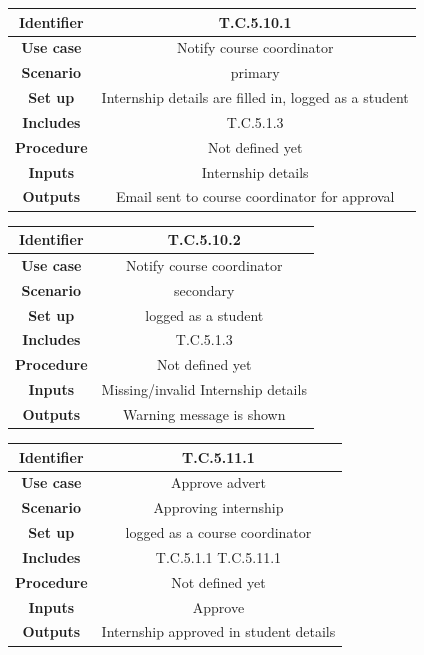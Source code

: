 \documentclass{l3deliverable}
\begin{document}
\begin{tabular}{|c|c|}
\hline \textbf{Identifier} & T.C.5.10.1\\
\hline \textbf{Use case} & Notify course coordinator\\
\hline \textbf{Scenario} & primary\\
\hline \textbf{Set up} & Internship details are filled in, logged as a student\\
\hline \textbf{Includes} & T.C.5.1.3\\
\hline \textbf{Procedure} & Not defined yet\\
\hline \textbf{Inputs} & Internship details\\
\hline \textbf{Outputs} & Email sent to course coordinator for approval\\
\hline
\end{tabular}

\begin{tabular}{|c|c|}
\hline \textbf{Identifier} & T.C.5.10.2\\
\hline \textbf{Use case} & Notify course coordinator\\
\hline \textbf{Scenario} & secondary\\
\hline \textbf{Set up} & logged as a student\\
\hline \textbf{Includes} & T.C.5.1.3\\
\hline \textbf{Procedure} & Not defined yet\\
\hline \textbf{Inputs} & Missing/invalid Internship details\\
\hline \textbf{Outputs} & Warning message is shown\\
\hline
\end{tabular}

\begin{tabular}{|c|c|}
\hline \textbf{Identifier} & T.C.5.11.1\\
\hline \textbf{Use case} & Approve advert\\
\hline \textbf{Scenario} & Approving internship\\
\hline \textbf{Set up} & logged as a course coordinator\\
\hline \textbf{Includes} & T.C.5.1.1 T.C.5.11.1\\
\hline \textbf{Procedure} & Not defined yet\\
\hline \textbf{Inputs} & Approve\\
\hline \textbf{Outputs} & Internship approved in student details\\
\hline
\end{tabular}
\end{document}
